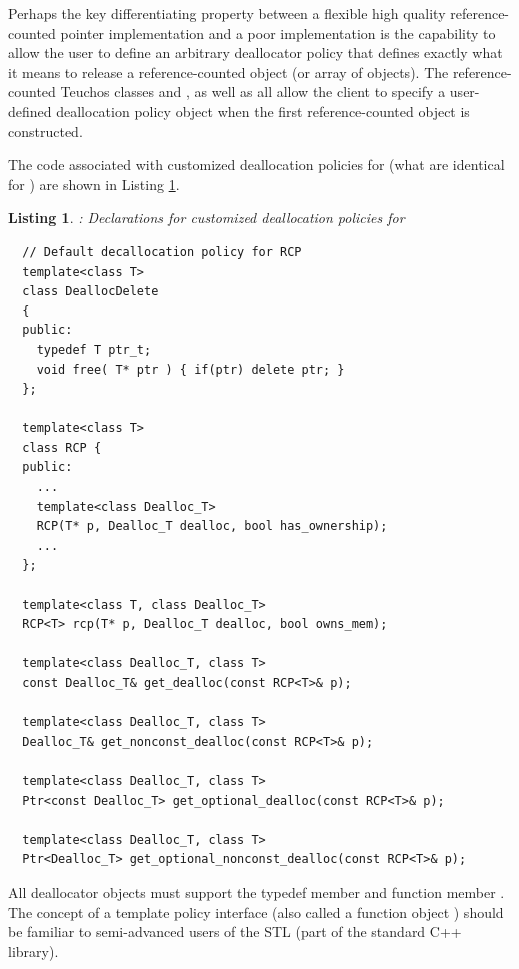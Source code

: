 \documentclass[pdf,ps2pdf,11pt]{SANDreport}
\newtheorem{listing}{Listing}
\begin{document}
Perhaps the key differentiating property between a flexible high
quality reference-counted pointer implementation and a poor
implementation is the capability to allow the user to define an
arbitrary deallocator policy that defines exactly what it means to
release a reference-counted object (or array of objects).  The
reference-counted Teuchos classes {} and
{}, as well as {} all
allow the client to specify a user-defined deallocation policy object
when the first reference-counted object is constructed.

The code associated with customized deallocation policies for
{} (what are identical for {}) are shown
in Listing {}\ref{listing:RCP-dealloc}.

\begin{listing}: Declarations for customized deallocation policies
for {} \\
\label{listing:RCP-dealloc}
{\small\begin{verbatim}
  // Default decallocation policy for RCP
  template<class T>
  class DeallocDelete
  {
  public:
    typedef T ptr_t;
    void free( T* ptr ) { if(ptr) delete ptr; }
  };

  template<class T>
  class RCP {
  public:
    ...
    template<class Dealloc_T>
    RCP(T* p, Dealloc_T dealloc, bool has_ownership);
    ...
  };
  
  template<class T, class Dealloc_T>
  RCP<T> rcp(T* p, Dealloc_T dealloc, bool owns_mem);
  
  template<class Dealloc_T, class T>
  const Dealloc_T& get_dealloc(const RCP<T>& p);
  
  template<class Dealloc_T, class T>
  Dealloc_T& get_nonconst_dealloc(const RCP<T>& p);
  
  template<class Dealloc_T, class T>
  Ptr<const Dealloc_T> get_optional_dealloc(const RCP<T>& p);
  
  template<class Dealloc_T, class T> 
  Ptr<Dealloc_T> get_optional_nonconst_dealloc(const RCP<T>& p);

\end{verbatim}}
\end{listing}

All deallocator objects must support the typedef member
{} and function member {}.  The concept
of a template policy interface (also called a function object
\cite[Section 18.4]{stroustrup97}) should be familiar to
semi-advanced users of the STL (part of the standard C++ library).
\end{document}
